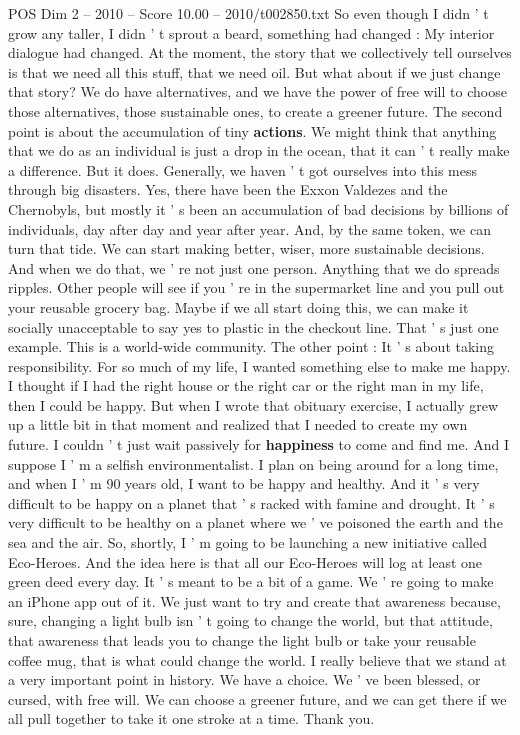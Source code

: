 \begin{textsample}{POS Dim 2 – 2010 – Score 10.00 – 2010/t002850.txt}
So even though I didn ' t grow any taller, I didn ' t sprout a beard, something had changed : My interior dialogue had changed.
At the moment, the story that we collectively tell ourselves is that we need all this stuff, that we need oil.
But what about if we just change that story?
We do have alternatives, and we have the power of free will to choose those alternatives, those sustainable ones, to create a greener future.
The second point is about the accumulation of tiny \textbf{actions}.
We might think that anything that we do as an individual is just a drop in the ocean, that it can ' t really make a difference.
But it does.
Generally, we haven ' t got ourselves into this mess through big disasters.
Yes, there have been the Exxon Valdezes and the Chernobyls, but mostly it ' s been an accumulation of bad decisions by billions of individuals, day after day and year after year.
And, by the same token, we can turn that tide.
We can start making better, wiser, more sustainable decisions.
And when we do that, we ' re not just one person.
Anything that we do spreads ripples.
Other people will see if you ' re in the supermarket line and you pull out your reusable grocery bag.
Maybe if we all start doing this, we can make it socially unacceptable to say yes to plastic in the checkout line.
That ' s just one example.
This is a world-wide community.
The other point : It ' s about taking responsibility.
For so much of my life, I wanted something else to make me happy.
I thought if I had the right house or the right car or the right man in my life, then I could be happy.
But when I wrote that obituary exercise, I actually grew up a little bit in that moment and realized that I needed to create my own future.
I couldn ' t just wait passively for \textbf{happiness} to come and find me.
And I suppose I ' m a selfish environmentalist.
I plan on being around for a long time, and when I ' m 90 years old, I want to be happy and healthy.
And it ' s very difficult to be happy on a planet that ' s racked with famine and drought.
It ' s very difficult to be healthy on a planet where we ' ve poisoned the earth and the sea and the air.
So, shortly, I ' m going to be launching a new initiative called Eco-Heroes.
And the idea here is that all our Eco-Heroes will log at least one green deed every day.
It ' s meant to be a bit of a game.
We ' re going to make an iPhone app out of it.
We just want to try and create that awareness because, sure, changing a light bulb isn ' t going to change the world, but that attitude, that awareness that leads you to change the light bulb or take your reusable coffee mug, that is what could change the world.
I really believe that we stand at a very important point in history.
We have a choice.
We ' ve been blessed, or cursed, with free will.
We can choose a greener future, and we can get there if we all pull together to take it one stroke at a time.
Thank you.

\end{textsample}
